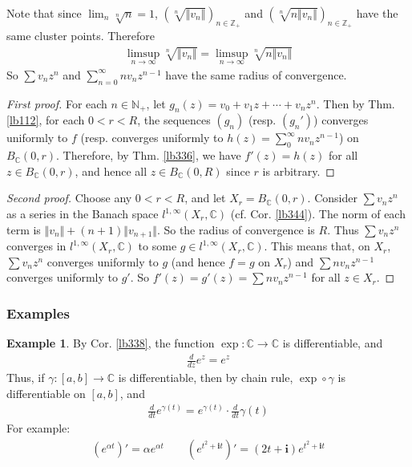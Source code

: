 \documentclass[12pt,b5paper,notitlepage]{article}
\theoremstyle{definition}
\newtheorem{eg}[df]{Example}
\theoremstyle{plain}
\newcommand{\im}{\mathbf{i}}
\newcommand{\Cbb}{\mathbb C}
\newcommand{\Nbb}{\mathbb N}
\newcommand{\Zbb}{\mathbb Z}
\numberwithin{equation}{section}
\begin{document}
Note that since $\lim_n\sqrt[n]{n}=1$, $(\sqrt[n]{\Vert v_n\Vert})_{n\in\Zbb_+}$ and $(\sqrt[n]{n\Vert v_n\Vert})_{n\in\Zbb_+}$ have the same cluster points. Therefore
\begin{align}
\limsup_{n\rightarrow\infty}\sqrt[n]{\Vert v_n\Vert}=\limsup_{n\rightarrow\infty}\sqrt[n]{n\Vert v_n\Vert}
\end{align}
So $\sum v_nz^n$ and $\sum_{n=0}^\infty nv_nz^{n-1}$ have the same radius of convergence.

\begin{proof}[First proof]
For each $n\in\Nbb_+$, let $g_n(z)=v_0+v_1z+\cdots+v_nz^n$. Then by Thm. \ref{lb112}, for each $0<r<R$, the sequences $(g_n)$ (resp. $(g_n')$) converges uniformly to $f$ (resp. converges uniformly to $h(z)=\sum_0^\infty nv_nz^{n-1}$) on $B_\Cbb(0,r)$. Therefore, by Thm. \ref{lb336}, we have $f'(z)=h(z)$ for all $z\in B_\Cbb(0,r)$, and hence all $z\in B_\Cbb(0,R)$ since $r$ is arbitrary.
\end{proof}

\begin{proof}[Second proof]
Choose any $0<r<R$, and let $X_r=B_\Cbb(0,r)$. Consider $\sum v_n z^n$ as a series in the Banach space $l^{1,\infty}(X_r,\Cbb)$ (cf. Cor. \ref{lb344}). The norm of each term is $\Vert v_n\Vert+(n+1)\Vert v_{n+1}\Vert$. So the radius of convergence is $R$. Thus  $\sum v_n z^n$ converges in $l^{1,\infty}(X_r,\Cbb)$ to some $g\in l^{1,\infty}(X_r,\Cbb)$. This means that, on $X_r$, $\sum v_nz^n$ converges uniformly to $g$ (and hence $f=g$ on $X_r$) and $\sum nv_nz^{n-1}$ converges uniformly  to $g'$. So $f'(z)=g'(z)=\sum nv_nz^{n-1}$ for all $z\in X_r$.
\end{proof}



\subsubsection{Examples}\label{lb353}

\begin{eg}
By Cor. \ref{lb338}, the function $\exp:\Cbb\rightarrow\Cbb$ is differentiable, and
\begin{align*}
\frac d{dz}e^z=e^z
\end{align*}
Thus, if $\gamma:[a,b]\rightarrow\Cbb$ is differentiable, then by chain rule, $\exp\circ\gamma$ is differentiable on $[a,b]$, and
\begin{align*}
\frac d{dt}e^{\gamma(t)}=e^{\gamma(t)}\cdot \frac d{dt}\gamma(t)
\end{align*}
For example:
\begin{align*}
(e^{\alpha t})'=\alpha e^{\alpha t}\qquad (e^{t^2+\im t})'=(2t+\im)e^{t^2+\im t}
\end{align*}
\end{eg}
\end{document}
